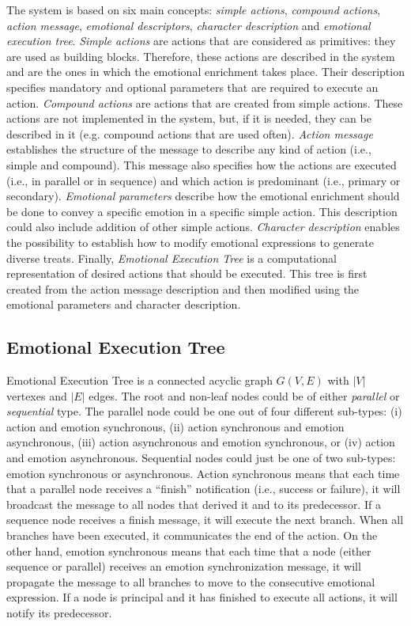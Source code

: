 \documentclass{sig-alternate-05-2015}
\begin{document}
The system is based on six main concepts: \textit{simple actions}, \textit{compound actions}, \textit{action message}, \textit{emotional descriptors}, \textit{character description} and \textit{emotional execution tree}. \textit{Simple actions} are actions that are considered as primitives: they are used as building blocks. Therefore, these actions are described in the system and are the ones in which the emotional enrichment takes place. Their description specifies mandatory and optional parameters that are required to execute an action. \textit{Compound actions} are actions that are created from simple actions. These actions are not implemented in the system, but, if it is needed, they can be described in it (e.g. compound actions that are used often). \textit{Action message} establishes the structure of the message to describe any kind of action (i.e., simple and compound). This message also specifies how the actions are executed (i.e., in parallel or in sequence) and which action is predominant (i.e., primary or secondary). \textit{Emotional parameters} describe how the emotional enrichment should be done to convey a specific emotion in a specific simple action. This description could also include addition of other simple actions. \textit{Character description} enables the possibility to establish how to modify emotional expressions to generate diverse treats. Finally, \textit{Emotional Execution Tree} is a computational representation of desired actions that should be executed. This tree is first created from the action message description and then modified using the emotional parameters and character description.   

\subsection{Emotional Execution Tree}

Emotional Execution Tree is a connected acyclic graph $G(V,E)$ with $|V|$ vertexes and $|E|$ edges. The root and non-leaf nodes could be of either \textit{parallel} or \textit{sequential} type. The parallel node could be one out of four different sub-types: (i) action and emotion synchronous, (ii) action synchronous and emotion asynchronous, (iii) action asynchronous and emotion synchronous, or (iv) action and emotion asynchronous. Sequential nodes could just be one of two sub-types: emotion synchronous or asynchronous. Action synchronous means that each time that a parallel node receives a ``finish'' notification (i.e., success or failure), it will broadcast the message to all nodes that derived it and to its predecessor. If a sequence node receives a finish message, it will execute the next branch. When all branches have been executed, it communicates the end of the action. On the other hand, emotion synchronous means that each time that a node (either sequence or parallel) receives an emotion synchronization message, it will propagate the message to all branches to move to the consecutive emotional expression. If a node is principal and it has finished to execute all actions, it will notify its predecessor. 
 
\end{document}
